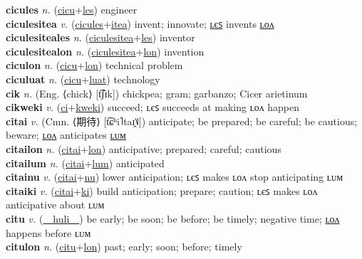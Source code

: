 \textbf{cicules} \textit{n.} (\hyperref[cicu]{cicu}+\hyperref[les]{les})
engineer \label{cicules} \\
\textbf{ciculesitea} \textit{v.} (\hyperref[cicules]{cicules}+\hyperref[itea]{itea})
invent; innovate; \hyperref[ciculesiteales]{ʟєꜱ} invents \hyperref[ciculesitealon]{ʟᴏᴧ} \label{ciculesitea} \\
\textbf{ciculesiteales} \textit{n.} (\hyperref[ciculesitea]{ciculesitea}+\hyperref[les]{les})
inventor \label{ciculesiteales} \\
\textbf{ciculesitealon} \textit{n.} (\hyperref[ciculesitea]{ciculesitea}+\hyperref[lon]{lon})
invention \label{ciculesitealon} \\
\textbf{ciculon} \textit{n.} (\hyperref[cicu]{cicu}+\hyperref[lon]{lon})
technical problem \label{ciculon} \\
\textbf{ciculuat} \textit{n.} (\hyperref[cicu]{cicu}+\hyperref[luat]{luat})
technology \label{ciculuat} \\
\textbf{cik} \textit{n.} (Eng. ⟨chick⟩ [t͡ʃɪk])
chickpea; gram; garbanzo; Cicer arietinum \label{cik} \\
\textbf{cikweki} \textit{v.} (\hyperref[ci]{ci}+\hyperref[kweki]{kweki})
succeed; ʟєꜱ succeeds at making ʟᴏᴧ happen \label{cikweki} \\
\textbf{citai} \textit{v.} (Cmn. ⟨期待⟩ [t͡ɕʰi˥taɪ̯˥˩])
anticipate; be prepared; be careful; be cautious; beware; \hyperref[citailon]{ʟᴏᴧ} anticipates \hyperref[citailum]{ʟᴜᴍ} \label{citai} \\
\textbf{citailon} \textit{n.} (\hyperref[citai]{citai}+\hyperref[lon]{lon})
anticipative; prepared; careful; cautious \label{citailon} \\
\textbf{citailum} \textit{n.} (\hyperref[citai]{citai}+\hyperref[lum]{lum})
anticipated \label{citailum} \\
\textbf{citainu} \textit{v.} (\hyperref[citai]{citai}+\hyperref[nu]{nu})
lower anticipation; ʟєꜱ makes ʟᴏᴧ stop anticipating ʟᴜᴍ \label{citainu} \\
\textbf{citaiki} \textit{v.} (\hyperref[citai]{citai}+\hyperref[ki]{ki})
build anticipation; prepare; caution; ʟєꜱ makes ʟᴏᴧ anticipative about ʟᴜᴍ \label{citaiki} \\
\textbf{citu} \textit{v.} (\hyperref[huli]{~~huli~~})
be early; be soon; be before; be timely; negative time; \hyperref[citulon]{ʟᴏᴧ} happens before ʟᴜᴍ \label{citu} \\
\textbf{citulon} \textit{n.} (\hyperref[citu]{citu}+\hyperref[lon]{lon})
past; early; soon; before; timely \label{citulon} \\
